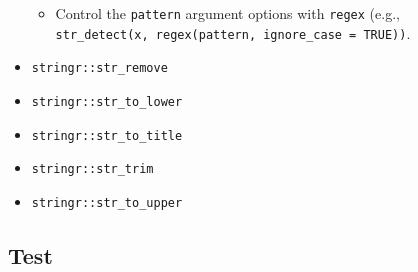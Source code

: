 \documentclass[
]{book}
\providecommand{\tightlist}{%
  \setlength{\itemsep}{0pt}\setlength{\parskip}{0pt}}
\begin{document}
\begin{itemize}
  \begin{itemize}
  \tightlist
  \item
    Control the \texttt{pattern} argument options with \texttt{regex} (e.g., \texttt{str\_detect(x,\ regex(pattern,\ ignore\_case\ =\ TRUE))}.
  \end{itemize}
\item
  \texttt{stringr::str\_remove}
\item
  \texttt{stringr::str\_to\_lower}
\item
  \texttt{stringr::str\_to\_title}
\item
  \texttt{stringr::str\_trim}
\item
  \texttt{stringr::str\_to\_upper}
\end{itemize}

\hypertarget{test}{%
\subsection{Test}\label{test}}
\end{document}
